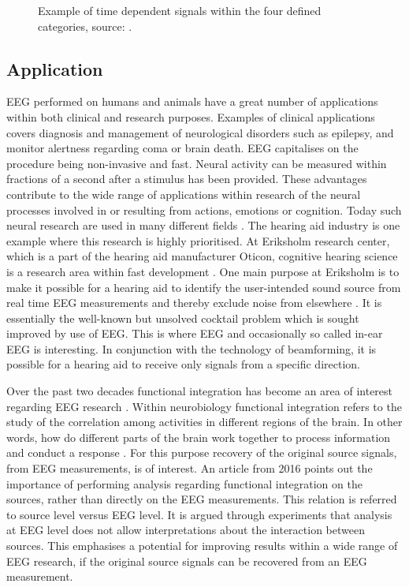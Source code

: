 \begin{figure}[H]
\begin{minipage}[t]{.45\textwidth}
        \caption{Example of time dependent signals within the four defined categories, source: \cite{EEGsignalprocessing}.}\label{fig:EEG_example}
    \end{minipage}
\end{figure}

\subsection{Application}\label{seg:application}
EEG performed on humans and animals have a great number of applications within both clinical and research purposes. 
Examples of clinical applications covers diagnosis and management of neurological disorders such as epilepsy, and monitor alertness regarding coma or brain death.
EEG capitalises on the procedure being non-invasive and fast.
Neural activity can be measured within fractions of a second after a stimulus has been provided. 
These advantages contribute to the wide range of applications within research of the neural processes involved in or resulting from actions, emotions or cognition. Today such neural research are used in many different fields \cite[p. 4]{fundamentalEEG}.
The hearing aid industry is one example where this research is highly prioritised. 
At Eriksholm research center, which is a part of the hearing aid manufacturer Oticon, cognitive hearing science is a research area within fast development \cite{Weberik}. 
One main purpose at Eriksholm is to make it possible for a hearing aid to identify the user-intended sound source from real time EEG measurements and thereby exclude noise from elsewhere \cite{Emina2019}\cite{Bech2018}. 
It is essentially the well-known but unsolved cocktail problem which is sought improved by use of EEG. 
This is where EEG and occasionally so called in-ear EEG is interesting. In conjunction with the technology of beamforming, it is possible for a hearing aid to receive only signals from a specific direction. 

Over the past two decades functional integration has become an area of interest regarding EEG research \cite{Friston2011}. 
Within neurobiology functional integration refers to the study of the correlation among activities in different regions of the brain. 
In other words, how do different parts of the brain work together to process information and conduct a response \cite{Friston2002}. 
For this purpose recovery of the original source signals, from EEG measurements, is of interest. 
An article from 2016 \cite{Van2019} points out the importance of performing analysis regarding functional integration on the sources, rather than directly on the EEG measurements. This relation is referred to source level versus EEG level. 
It is argued through experiments that analysis at EEG level does not allow interpretations about the interaction between sources. 
This emphasises a potential for improving results within a wide range of EEG research, if the original source signals can be recovered from an EEG measurement.    

